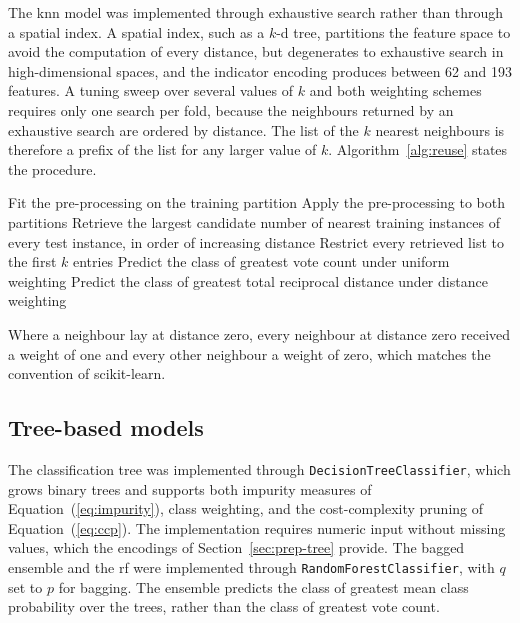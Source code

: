 The \gls{knn} model was implemented through exhaustive search rather than
through a spatial index. A spatial index, such as a $k$-d tree, partitions the
feature space to avoid the computation of every distance, but degenerates to
exhaustive search in high-dimensional spaces, and the indicator encoding
produces between 62 and 193 features. A tuning sweep over several values of
$k$ and both weighting schemes requires only one search per fold, because
the neighbours returned by an exhaustive search are ordered by distance. The
list of the $k$ nearest neighbours is therefore a prefix of the list for
any larger value of $k$. Algorithm~\ref{alg:reuse} states the procedure.

\begin{algorithm}[!t]
\caption{Neighbour reuse for a control parameter sweep}
\label{alg:reuse}
\begin{algorithmic}[1]
  \State Fit the pre-processing on the training partition
  \State Apply the pre-processing to both partitions
  \State Retrieve the largest candidate number of nearest training instances
         of every test instance, in order of increasing distance
    \State Restrict every retrieved list to the first $k$ entries
    \State Predict the class of greatest vote count under uniform weighting
    \State Predict the class of greatest total reciprocal distance under
           distance weighting
  \EndFor
\EndFor
\end{algorithmic}
\end{algorithm}

Where a neighbour lay at distance zero, every neighbour at distance zero
received a weight of one and every other neighbour a weight of zero, which
matches the convention of scikit-learn.

\subsection{Tree-based models}

The classification tree was implemented through
\texttt{DecisionTreeClassifier}, which grows binary trees and supports both
impurity measures of Equation~(\ref{eq:impurity}), class weighting, and the
cost-complexity pruning of Equation~(\ref{eq:ccp}). The implementation
requires numeric input without missing values, which the encodings of
Section~\ref{sec:prep-tree} provide. The bagged ensemble and the \gls{rf}
were implemented through \texttt{RandomForestClassifier}, with $q$ set to
$p$ for bagging. The ensemble predicts the class of greatest mean class
probability over the trees, rather than the class of greatest vote count.

